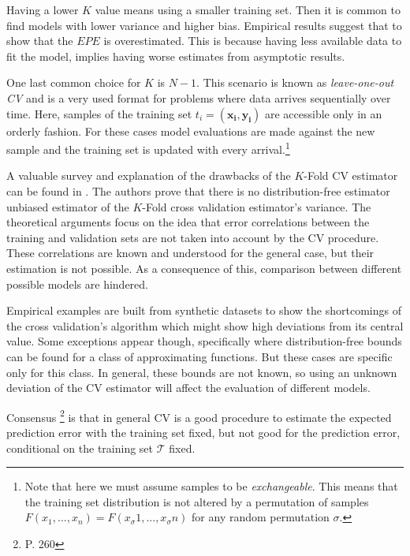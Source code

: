Having a lower $K$ value means using a smaller training set. Then it is common to find models with lower variance and higher bias. Empirical results suggest that to show that the $EPE$ is overestimated. This is because having less available data to fit the model, implies having worse estimates from asymptotic results.

One last common choice for $K$ is $N-1$. This scenario is known as \textit{leave-one-out CV} and is a very used format for problems where data arrives sequentially over time. Here, samples of the training set $t_i = ( \boldsymbol{x_i} , \boldsymbol{y_i} )$ are accessible only in an orderly fashion. For these cases model evaluations are made against the new sample and the training set is updated with every arrival.\footnote{Note that here we must assume samples to be \textit{exchangeable}. This means that the training set distribution is not altered by a permutation of samples $F(x_1,...,x_n ) = F(x_\sigma{1},...,x_\sigma{n})$ for any random permutation $\sigma$.}



A valuable survey and explanation of the drawbacks of the $K$-Fold CV estimator can be found in \textcite{bengio-unbiasedCvEstimator}. The authors prove that there is no distribution-free estimator unbiased estimator of the $K$-Fold cross validation estimator's variance. The theoretical arguments focus on the idea that error correlations between the training and validation sets are not taken into account by the CV procedure. These correlations are known and understood for the general case, but their estimation is not possible. As a consequence of this, comparison between different possible models are hindered.

Empirical examples are built from synthetic datasets to show the shortcomings of the cross validation's algorithm which might show high deviations from its central value. Some exceptions appear though, specifically where distribution-free bounds can be found for a class of approximating functions. But these cases are specific only for this class. In general, these bounds are not known, so using an unknown deviation of the CV estimator will affect the evaluation of different models.

Consensus \footnote{\textcite{hastie-elemstatslearn} P. 260} is that in general CV is a good procedure to estimate the expected prediction error with the training set fixed, but not good for the prediction error, conditional on the training set $\mathcal{T}$ fixed.



